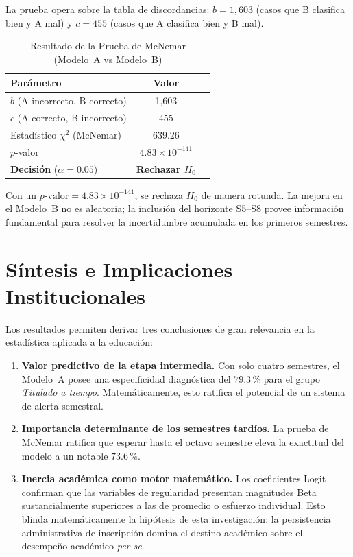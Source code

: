 La prueba opera sobre la tabla de discordancias: $b = 1{,}603$ (casos que B clasifica bien y A mal)
y $c = 455$ (casos que A clasifica bien y B mal).

\begin{table}[H]
\centering
\caption{Resultado de la Prueba de McNemar (Modelo~A vs Modelo~B)}
\label{tab:mcnemar}
\begin{tabular}{lcc}
\toprule
\textbf{Parámetro} & \textbf{Valor} \\
\midrule
$b$ (A incorrecto, B correcto) & 1,603 \\
$c$ (A correcto, B incorrecto) & 455 \\
Estadístico $\chi^2$ (McNemar)   & 639.26 \\
$p$-valor                       & $4.83 \times 10^{-141}$ \\
\midrule
\textbf{Decisión} ($\alpha = 0.05$) & \textbf{Rechazar $H_0$} \\
\bottomrule
\end{tabular}
\end{table}

\noindent
Con un $p\text{-valor} = 4.83 \times 10^{-141}$, se rechaza $H_0$ de manera rotunda. La mejora en el Modelo~B no
es aleatoria; la inclusión del horizonte S5–S8 provee información fundamental para resolver
la incertidumbre acumulada en los primeros semestres.

\section{Síntesis e Implicaciones Institucionales}

Los resultados permiten derivar tres conclusiones de gran relevancia en la estadística aplicada a la educación:

\begin{enumerate}
    \item \textbf{Valor predictivo de la etapa intermedia.} Con solo cuatro semestres,
          el Modelo~A posee una especificidad diagnóstica del $79.3\,\%$ para el grupo \emph{Titulado a tiempo}.
          Matemáticamente, esto ratifica el potencial de un sistema de alerta semestral.

    \item \textbf{Importancia determinante de los semestres tardíos.} La prueba de
          McNemar ratifica que esperar hasta el octavo semestre eleva la exactitud
          del modelo a un notable $73.6\,\%$.

    \item \textbf{Inercia académica como motor matemático.} Los coeficientes Logit confirman que las
          variables de regularidad presentan magnitudes Beta sustancialmente superiores a las de promedio
          o esfuerzo individual. Esto blinda matemáticamente la hipótesis de esta investigación: 
          la persistencia administrativa de inscripción domina el destino académico sobre el desempeño académico \emph{per se}.
\end{enumerate}

